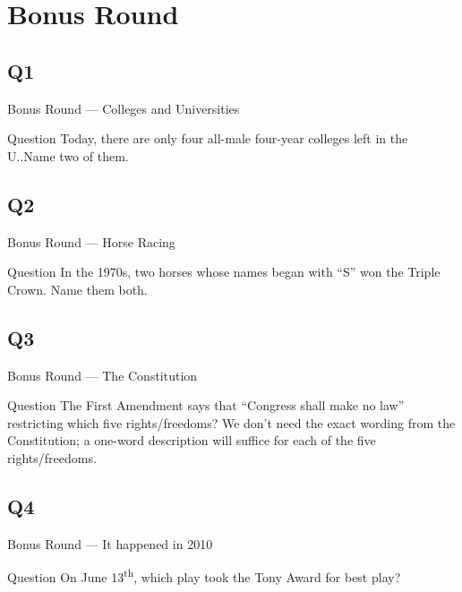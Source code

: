 \documentclass[11pt]{beamer}
\begin{document}
\section{Bonus Round}
\subsection*{Q1}
\begin{frame}[t]{Bonus Round --- Colleges and Universities}
\vspace{-0.5em}
\begin{block}{Question}
Today, there are only four all-male four-year colleges left in the U.\@S.\@ Name two of them.
\end{block}
\end{frame}
\subsection*{Q2}
\begin{frame}[t]{Bonus Round --- Horse Racing}
\vspace{-0.5em}
\begin{block}{Question}
In the 1970s, two horses whose names began with ``S'' won the Triple Crown.  Name them both.
\end{block}
\end{frame}
\subsection*{Q3}
\begin{frame}[t]{Bonus Round --- The Constitution}
\vspace{-0.5em}
\begin{block}{Question}
The First Amendment says that ``Congress shall make no law'' restricting which five rights/freedoms? We don't need the exact wording from the Constitution; a one-word description will suffice for each of the five rights/freedoms.
\end{block}
\end{frame}
\subsection*{Q4}
\begin{frame}[t]{Bonus Round --- It happened in 2010}
\vspace{-0.5em}
\begin{block}{Question}
On June 13\textsuperscript{th}, which play took the Tony Award for best play?
\end{block}
\end{frame}
\end{document}
